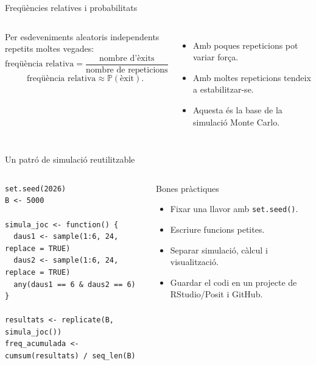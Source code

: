 \documentclass[10pt,aspectratio=169]{beamer}
\newcommand{\RStudio}{\textsf{RStudio/Posit}}
\newcommand{\GitHub}{\textsf{GitHub}}
\newcommand{\Prob}{\mathbb{P}}
\begin{document}
\begin{frame}{Freqüències relatives i probabilitats}
\begin{columns}[T]
Per esdeveniments aleatoris independents repetits moltes vegades:
\[
\text{freqüència relativa} = \frac{\text{nombre d'èxits}}{\text{nombre de repeticions}}
\]
\vspace{-0.1cm}
\[
\text{freqüència relativa} \approx \Prob(\text{èxit}).
\]
\begin{itemize}
  \item Amb poques repeticions pot variar força.
  \item Amb moltes repeticions tendeix a estabilitzar-se.
  \item Aquesta és la base de la simulació Monte Carlo.
\end{itemize}
\end{columns}
\end{frame}

\begin{frame}[fragile]{Un patró de simulació reutilitzable}
\begin{columns}[T]
\begin{lstlisting}
set.seed(2026)
B <- 5000

simula_joc <- function() {
  daus1 <- sample(1:6, 24, replace = TRUE)
  daus2 <- sample(1:6, 24, replace = TRUE)
  any(daus1 == 6 & daus2 == 6)
}

resultats <- replicate(B, simula_joc())
freq_acumulada <- cumsum(resultats) / seq_len(B)
\end{lstlisting}
\begin{block}{Bones pràctiques}
\begin{itemize}
  \item Fixar una llavor amb \texttt{set.seed()}.
  \item Escriure funcions petites.
  \item Separar simulació, càlcul i visualització.
  \item Guardar el codi en un projecte de \RStudio{} i \GitHub{}.
\end{itemize}
\end{block}
\end{columns}
\end{frame}
\end{document}
